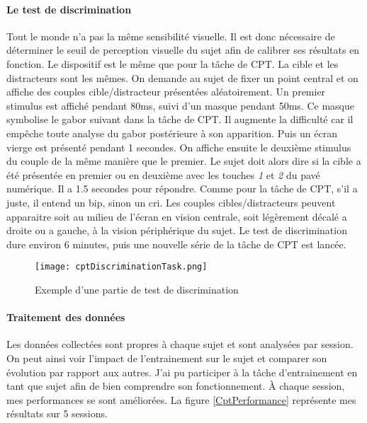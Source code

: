 \paragraph{Le test de discrimination}Tout le monde n'a pas la même sensibilité visuelle. Il est donc nécessaire de déterminer le seuil de perception visuelle du sujet afin de calibrer
ses résultats en fonction. Le dispositif est le même que pour la tâche de CPT. La cible et les distracteurs sont les mêmes. On demande au sujet de fixer un point central et on affiche
des couples cible/distracteur présentées aléatoirement. Un premier stimulus est affiché pendant 80ms, suivi d'un masque pendant 50ms. Ce masque symbolise le gabor suivant dans la
tâche de CPT. Il augmente la difficulté car il empêche toute analyse du gabor postérieure à son apparition. Puis un écran vierge est présenté pendant 1 secondes. On affiche ensuite
le deuxième stimulus du couple de la même manière que le premier. Le sujet doit alors dire si la cible a été présentée en premier ou en deuxième avec les touches \emph{1} et \emph{2}
du pavé numérique. Il a 1.5 secondes pour répondre. Comme pour la tâche de CPT, s'il a juste, il entend un bip, sinon un cri. Les couples cibles/distracteurs peuvent apparaitre soit
au milieu de l'écran en vision centrale, soit légèrement décalé a droite ou a gauche, à la vision périphérique du sujet. Le test de discrimination dure environ 6 minutes, puis une
nouvelle série de la tâche de CPT est lancée.

\begin{figure}[H]
    \begin{center}
    \texttt{[image: cptDiscriminationTask.png]}
    \end{center}
    \caption{Exemple d'une partie de test de discrimination}
\label{CptDiscriminationTask}
\end{figure}


\paragraph{Traitement des données}Les données collectées sont propres à chaque sujet et sont analysées par session. On peut ainsi voir l'impact de l'entrainement sur le
sujet et comparer son évolution par rapport aux autres. J'ai pu participer à la tâche d'entrainement en tant que sujet afin de bien comprendre son fonctionnement. \`{A}
chaque session, mes performances se sont améliorées. La figure \ref{CptPerformance} représente mes résultats sur 5 sessions.

